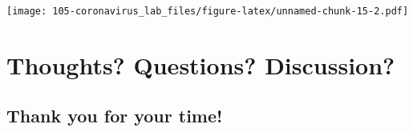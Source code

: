 \documentclass[
]{book}
\begin{document}
\texttt{[image: 105-coronavirus\_lab\_files/figure-latex/unnamed-chunk-15-2.pdf]}

\hypertarget{thoughts-questions-discussion}{%
\chapter{Thoughts? Questions? Discussion?}\label{thoughts-questions-discussion}}

\hypertarget{thank-you-for-your-time}{%
\section{Thank you for your time!}\label{thank-you-for-your-time}}

  
\end{document}
